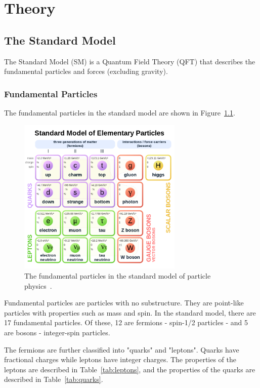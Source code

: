 \chapter{Theory}\label{chap:cms}



\section{The Standard Model}

The Standard Model (SM) is a Quantum Field Theory (QFT) that describes the fundamental particles and forces (excluding gravity).


\subsection{Fundamental Particles}

The fundamental particles in the standard model are shown in Figure~\ref{fig:sm}.

\begin{figure}[h]
	\centering
	\includegraphics[width=0.7\textwidth]{figures/sm_blocks.png}
	\caption{The fundamental particles in the standard model of particle physics~\cite{StandardModel}.}
	\label{fig:sm}
\end{figure}



Fundamental particles are particles with no substructure. They are point-like particles with properties such as mass and spin. In the standard model, there are 17 fundamental particles. Of these, 12 are fermions - spin-1/2 particles - and 5 are bosons - integer-spin particles. 

The fermions are further classified into "quarks" and "leptons". Quarks have fractional charges while leptons have integer charges. The properties of the leptons are described in Table~\ref{tab:leptons}, and the properties of the quarks are described in Table~\ref{tab:quarks}. 





